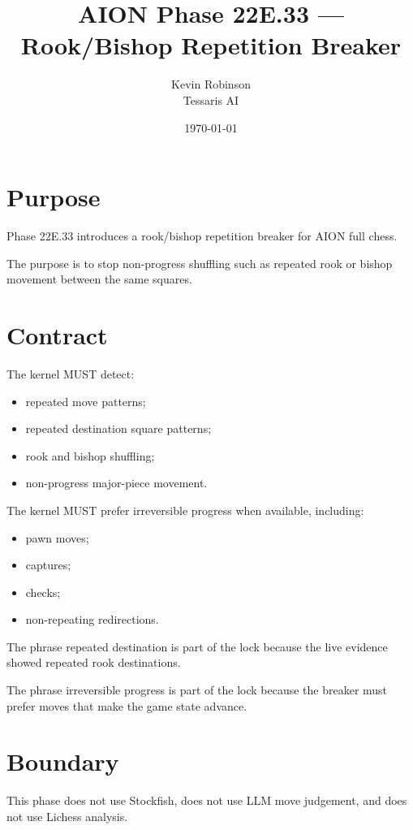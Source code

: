 \documentclass[11pt,a4paper]{article}
\title{\textbf{AION Phase 22E.33 --- Rook/Bishop Repetition Breaker}}
\author{Kevin Robinson\\Tessaris AI}
\date{\today}
\begin{document}
\maketitle

\section{Purpose}

Phase 22E.33 introduces a rook/bishop repetition breaker for AION full chess.

The purpose is to stop non-progress shuffling such as repeated rook or bishop movement between the same squares.

\section{Contract}

The kernel MUST detect:

\begin{itemize}[leftmargin=*]
  \item repeated move patterns;
  \item repeated destination square patterns;
  \item rook and bishop shuffling;
  \item non-progress major-piece movement.
\end{itemize}

The kernel MUST prefer irreversible progress when available, including:

\begin{itemize}[leftmargin=*]
  \item pawn moves;
  \item captures;
  \item checks;
  \item non-repeating redirections.
\end{itemize}

The phrase repeated destination is part of the lock because the live evidence showed repeated rook destinations.

The phrase irreversible progress is part of the lock because the breaker must prefer moves that make the game state advance.

\section{Boundary}

This phase does not use Stockfish, does not use LLM move judgement, and does not use Lichess analysis.
\end{document}
